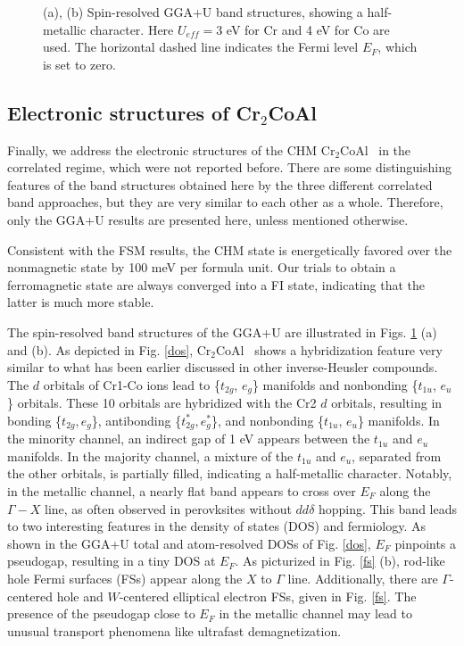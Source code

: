 \documentclass[preprint,5p]{elsarticle}
\newcommand{\cca}{Cr$_2$CoAl}
\begin{document}
\begin{figure}[tbp]
{}
\caption{(a), (b) Spin-resolved GGA+U band structures, showing a half-metallic character.
Here $U_{eff}=3$ eV for Cr and 4 eV for Co are used.
The horizontal dashed line indicates the Fermi level $E_F$, which is set to zero.
}
\label{band}
\end{figure}



\subsection{Electronic structures of Cr$_2$CoAl}

Finally, we address the electronic structures of the CHM \cca~ in the correlated regime,
which were not reported before.
There are some distinguishing features of the band structures obtained here 
by the three different correlated band approaches,
but they are very similar to each other as a whole. 
Therefore, only the GGA+U results are presented here, unless mentioned otherwise.

Consistent with the FSM results, the CHM state is energetically favored 
over the nonmagnetic state by 100 meV per formula unit.
Our trials to obtain a ferromagnetic state are always converged into a FI state, 
indicating that the latter is much more stable.



The spin-resolved band structures of the GGA+U are illustrated in Figs. \ref{band} (a) and (b).
As depicted in Fig. \ref{dos},
\cca~ shows a hybridization feature very similar to what has been earlier discussed
in other inverse-Heusler compounds.\cite{gal}
The $d$ orbitals of Cr1-Co ions 
lead to \{$t_{2g}$, $e_{g}$\} manifolds and nonbonding \{$t_{1u}$, $e_{u}$\} orbitals.
These 10 orbitals are hybridized with the Cr2 $d$ orbitals, 
resulting in bonding \{$t_{2g}, e_g$\}, antibonding \{$t_{2g}^\ast, e_g^\ast$\},
and nonbonding \{$t_{1u}$, $e_{u}$\} manifolds.
In the minority channel, an indirect gap of 1 eV appears between the $t_{1u}$ and $e_u$ manifolds.
In the majority channel, a mixture of the $t_{1u}$ and $e_u$, separated from the other orbitals,
is partially filled, indicating a half-metallic character.
Notably, in the metallic channel, 
a nearly flat band appears to cross over $E_F$ along the $\Gamma-X$ line,
as often observed in perovksites without $dd\delta$ hopping.\cite{srcro}
This band leads to two interesting features in the density of states (DOS) and fermiology.
As shown in the GGA+U total and atom-resolved DOSs of Fig. \ref{dos}, 
$E_F$ pinpoints a pseudogap, resulting in a tiny DOS at $E_F$.
As picturized in Fig. \ref{fs} (b), rod-like hole Fermi surfaces (FSs) appear along the $X$ to $\Gamma$ line. 
Additionally, there are $\Gamma$-centered hole and $W$-centered elliptical electron FSs,
given in Fig. \ref{fs}.
The presence of the pseudogap close to $E_F$ in the metallic channel
may lead to unusual transport phenomena like ultrafast demagnetization.\cite{mann}
\end{document}
